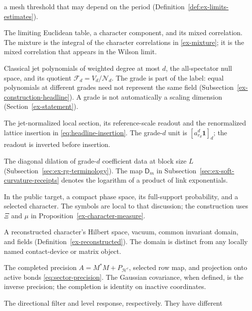 \begin{description}
a mesh threshold that may depend on the period
(Definition~\ref{def:ex-limits-estimates}).
\item[$S$, $S^\chi$, $S^{\rm mix}$] The limiting Euclidean table, a
character component, and its mixed correlation. The mixture is the integral
of the character correlations in \eqref{ex-mixture}; it is the mixed
correlation that appears in the Wilson limit.
\item[$V_d$, $\mathcal N_d$, $\mathcal F_d$, ${[v]}_d$] Classical jet
polynomials of weighted degree at most $d$, the all-spectator null space,
and its quotient $\mathcal F_d=V_d/\mathcal N_d$. The grade is part of
the label: equal polynomials at different grades need not represent the
same field (Subsection~\ref{ex-construction-headline}). A grade is not automatically a
scaling dimension (Section~\ref{ex-statement}).
\item[$L_d$, $R_{d,N,p}$, $I^{(d)}_{N,p}$] The jet-normalized local
section, its reference-scale readout and the renormalized lattice
insertion in \eqref{eq:headline-insertion}. The grade-$d$ unit is
$[a_{r_d}^{d}\mathbf1]_d$; the readout is inverted before insertion.
\item[$\mathsf D^{\rm gr}_{d,L}$] The diagonal dilation of grade-$d$
coefficient data at block size $L$ (Subsection~\ref{sec:ex-rg-terminology}).
The map $\mathsf D_m$ in Subsection~\ref{sec:ex-soft-curvature-receipts}
denotes the logarithm of a product of link exponentials.
\item[$X$, $\nu$, $\chi_*$] In the public target, a compact phase space,
its full-support probability, and a selected character. The symbols are
local to that discussion; the construction uses $\Xi$ and $\mu$ in
Proposition~\ref{ex-character-measure}.
\item[$\mathcal H$, $\Omega$, $\mathcal D$, $\Phi$] A reconstructed character's
Hilbert space, vacuum, common invariant domain, and fields
(Definition~\ref{ex-reconstructed}). The domain is distinct from any
locally named contact-device or matrix object.
\item[$A$, $M$, $P_{\mathcal H}$ in the sector calculation] The completed
precision $A=M^*M+P_{\mathcal H^c}$, selected row map, and projection
onto active bonds \eqref{eq:sector-precision}. The Gaussian covariance,
when defined, is the inverse precision; the completion is identity on
inactive coordinates.
\item[$D_{v,a}$ and $\mathscr D_{v,a}$ in the free-kernel calculation]
The directional filter and level response, respectively. They have different

\end{description}
